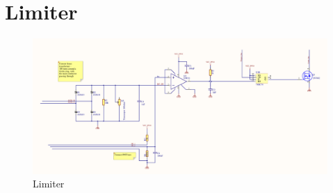 



\section{Limiter}

\begin{figure}[h!]
    \centering
    \includegraphics[width=\textwidth]{Skjema/Limiter.pdf}
    \caption{Limiter}
    \label{fig:my_label}
\end{figure}

